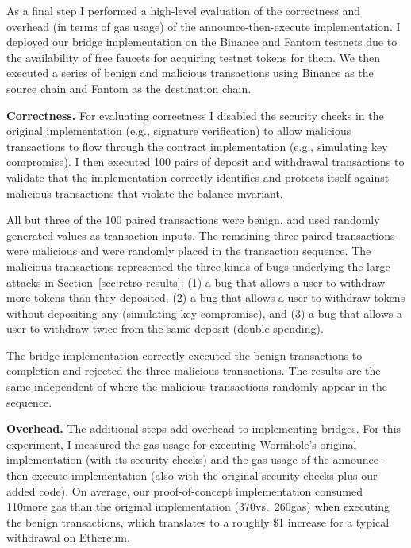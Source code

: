 As a final step I performed a high-level evaluation of the
correctness and overhead (in terms of gas usage) of the
announce-then-execute implementation.  I deployed our bridge
implementation on the Binance and Fantom testnets due to the
availability of free faucets for acquiring testnet tokens for them.
We then executed a series of benign and malicious transactions using
Binance as the source chain and Fantom as the destination chain.



\textbf{Correctness.}  For evaluating correctness I disabled the
security checks in the original implementation (e.g., signature
verification) to allow malicious transactions to flow through the
contract implementation (e.g., simulating key compromise).  I then
executed 100 pairs of deposit and withdrawal transactions to validate
that the implementation correctly identifies and protects itself
against malicious transactions that violate the balance invariant.

All but three of the 100 paired transactions were benign, and used
randomly generated values as transaction inputs.
%
The remaining three paired transactions were malicious and were
randomly placed in the transaction sequence.  The malicious
transactions represented the three kinds of bugs underlying the
large attacks in Section~\ref{sec:retro-results}: (1) a bug that
allows a user to withdraw more tokens than they deposited, (2) a bug
that allows a user to withdraw tokens without depositing any
(simulating key compromise), and (3) a bug that allows a user to
withdraw twice from the same deposit (double spending).

The bridge implementation correctly executed the benign transactions
to completion and rejected the three malicious transactions.  The
results are the same independent of where the malicious transactions
randomly appear in the sequence.

\textbf{Overhead.}  The additional steps add overhead to implementing
bridges.  For this experiment, I measured the gas usage for executing
Wormhole's original implementation (with its security checks) and the
gas usage of the announce-then-execute implementation (also with the
original security checks plus our added code).  On average, our
proof-of-concept implementation consumed 110\thou more gas than the
original implementation (370\thou vs.\ 260\thou gas) when
executing the benign transactions, which translates to a
roughly \$1 increase for a typical withdrawal on Ethereum.

